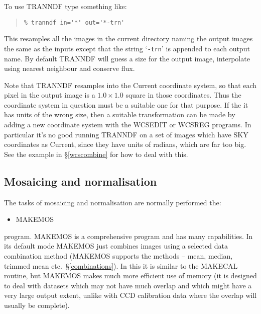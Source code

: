 \documentclass[twoside,11pt]{article}
\newcommand{\hyperref}[4]{#2\ref{#4}#3}
\newcommand{\htmlref}[2]{#1}
\newcommand{\xlabel}[1]{}
\renewcommand{\_}{\texttt{\symbol{95}}}
\newenvironment{myquote}{\begin{quote}\begin{small}}{\end{small}\end{quote}}
\newcommand{\text}[1]{{\small \tt #1}}
\newcommand{\routine}[1]{{\sc #1}}
\newcommand{\xroutine}[1]{\htmlref{{\sc #1}}{#1}}
\begin{document}
To use \routine{TRANNDF} type something like:
\begin{myquote}
\begin{verbatim}
% tranndf in='*' out='*-trn'
\end{verbatim}
\end{myquote}
This resamples all the images in the current directory naming the output
images the same as the inputs except that the string `\text{-trn}' is
appended to each output name. 
By default \routine{TRANNDF} will guess a size for
the output image, interpolate using nearest neighbour and conserve flux.

Note that \routine{TRANNDF} resamples into the Current coordinate system,
so that each pixel in the output image is a $1.0 \times 1.0$ square 
in those coordinates.  Thus the coordinate system in question must be
a suitable one for that purpose.  If the it has units of 
the wrong size, then a suitable transformation can be made by
adding a new coordinate system with the
\xroutine{WCSEDIT} or \xroutine{WCSREG} programs.
In particular it's no good running \routine{TRANNDF} on a set of
images which have SKY coordinates as Current, since they have
units of radians, which are far too big.
See the example in \hyperref{the section about WCSREG}{\S }{}{wcscombine}
for how to deal with this.



\subsection{\xlabel{mosaic_normalise}\label{mos_norm}Mosaicing and 
            normalisation}

The tasks of mosaicing and normalisation are normally performed the:
\begin{itemize}
\item \xroutine{MAKEMOS}
\end{itemize}
program.
\routine{MAKEMOS} is a comprehensive program and has many
capabilities. In its default mode \routine{MAKEMOS} 
just combines images using a
selected data combination method (\routine{MAKEMOS} supports the
methods -- mean, median, trimmed mean etc.\ \S\ref{combinations}).
In this it is similar to the \xroutine{MAKECAL} routine, but
\routine{MAKEMOS} makes much more efficient use of
memory (it is designed to deal with datasets which may not have much
overlap and which might have a very large output extent, unlike with CCD
calibration data where the overlap will usually be complete).
\end{document}

